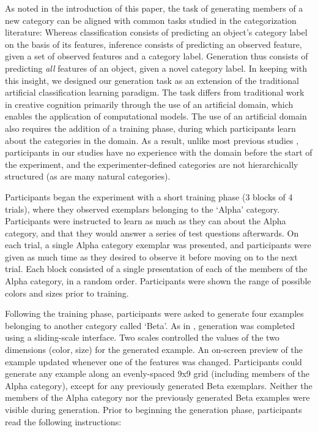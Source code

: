 \documentclass[12pt]{article}
\begin{document}
\begin{flushleft}
As noted in the introduction of this paper, the task of generating members of a
new category can be aligned with common tasks studied in the categorization
literature: Whereas classification consists of predicting an object's category
label on the basis of its features, inference consists of predicting an observed
feature, given a set of observed features and a category label. Generation thus
consists of predicting {\em all} features of an object, given a novel category
label. In keeping with this insight, we designed our generation task as an
extension of the traditional artificial classification learning paradigm. The
task differs from traditional work in creative cognition primarily through the
use of an artificial domain, which enables the application of computational
models. The use of an artificial domain also requires the addition of a training
phase, during which participants learn about the categories in the domain. As a
result, unlike most previous studies \citep[e.g.,][]{ward1994structured},
participants in our studies have no experience with the domain before the start
of the experiment, and the experimenter-defined categories are not
hierarchically structured (as are many natural categories).

Participants began the experiment with a short training phase (3 blocks of 4
trials), where they observed exemplars belonging to the `Alpha' category.
Participants were instructed to learn as much as they can about the Alpha
category, and that they would answer a series of test questions afterwards. On
each trial, a single Alpha category exemplar was presented, and participants
were given as much time as they desired to observe it before moving on to the
next trial. Each block consisted of a single presentation of each of the members
of the Alpha category, in a random order. Participants were shown the range of
possible colors and sizes prior to training.

Following the training phase, participants were asked to generate four examples
belonging to another category called `Beta'. As in
\citet{jern2013probabilistic}, generation was completed using a sliding-scale
interface. Two scales controlled the values of the two dimensions (color, size)
for the generated example. An on-screen preview of the example updated whenever
one of the features was changed. Participants could generate any example along
an evenly-spaced 9x9 grid (including members of the Alpha category), except for
any previously generated Beta exemplars. Neither the members of the Alpha
category nor the previously generated Beta examples were visible during
generation. Prior to beginning the generation phase, participants read the
following instructions:


\end{flushleft}
\end{document}
